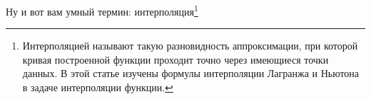 \documentclass[10pt,a4paper]{report}
\begin{document}
Ну и вот вам умный термин: интерполяция\footnote{Интерполяцией называют такую разновидность аппроксимации, при которой кривая построенной функции проходит точно через имеющиеся точки данных. В этой статье изучены формулы интерполяции Лагранжа и Ньютона в задаче интерполяции функции.}

\end{document}
